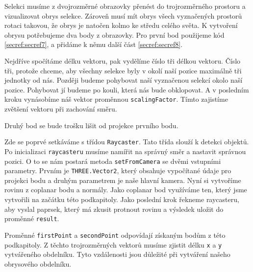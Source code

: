 \documentclass[czech,bachelor,dept420,male,cpdeclaration]{diploma}
\begin{document}
Selekci musíme z dvojrozměrné obrazovky přenést do trojrozměrného prostoru a vizualizovat obrys selekce. Zároveň musí mít obrys všech vyznačených prostorů rotaci takovou, že obrys je natočen kolmo ke středu celého světa. K vytvoření obrysu potřebujeme dva body z obrazovky. Pro první bod použijeme kód \ref{secref:secref7}, a přidáme k němu další část \ref{secref:secref8}.



Nejdříve spočítáme délku vektoru, pak vydělíme číslo tři délkou vektoru. Číslo tři, protože chceme, aby všechny selekce byly v okolí naší pozice maximálně tři jednotky od nás. Později budeme pohybovat naší vyznačenou selekcí okolo naší pozice. Pohybovat jí budeme po kouli, která nás bude obklopovat. A v posledním kroku vynásobíme náš vektor proměnnou \texttt{scalingFactor}. Tímto zajistíme zvětšení vektoru při zachování směru. 

Druhý bod se bude trošku lišit od projekce prvního bodu. 



Zde se poprvé setkáváme s třídou \texttt{Raycaster}. Tato třída slouží k detekci objektů. Po inicializaci \texttt{raycasteru} musíme namířit na správný směr a nastavit správnou pozici. O to se nám postará metoda \texttt{setFromCamera} se dvěmi vstupními parametry. Prvním je \texttt{THREE.Vector2}, který obsahuje vypočítané údaje pro projekci bodu a druhým parametrem je naše hlavní kamera. Nyní si vytvoříme rovinu z coplanar bodu a normály. Jako coplanar bod využíváme ten, který jsme vytvořili na začátku této podkapitoly. Jako poslední krok řekneme raycasteru, aby vyslal paprsek, který má zkusit protnout rovinu a výsledek uložit do proměnné \texttt{result}.


\begin{minipage}{\linewidth}
  
\end{minipage}

Proměnné \texttt{firstPoint} a \texttt{secondPoint} odpovídají získaným bodům z této podkapitoly. Z těchto trojrozměrných vektorů musíme zjistit délku \texttt{x} a \texttt{y} vytvářeného obdelníku. Tyto vzdálenosti jsou důležité při vytváření našeho obrysového obdelníku. 
\end{document}
